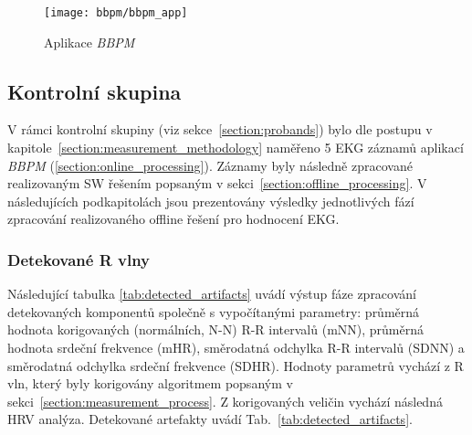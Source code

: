 \begin{figure}[H]
	\begin{center}
		\texttt{[image: bbpm/bbpm\_app]}
		\caption{Aplikace \textit{BBPM}}
		\label{fig:results_bbpm}
	\end{center}
\end{figure}

\clearpage

\subsection{Kontrolní skupina}
\label{sections:results_probands}
V rámci kontrolní skupiny (viz sekce~\ref{section:probands}) bylo dle postupu v
kapitole~\ref{section:measurement_methodology} naměřeno 5 EKG záznamů aplikací
\textit{BBPM} (\ref{section:online_processing}). Záznamy byly následně
zpracované realizovaným SW řešením popsaným v
sekci~\ref{section:offline_processing}. V následujících podkapitolách jsou
prezentovány výsledky jednotlivých fází zpracování realizovaného offline řešení
pro hodnocení EKG.

\subsubsection{Detekované R vlny}
Následující tabulka \ref{tab:detected_artifacts} uvádí výstup fáze zpracování
detekovaných komponentů společně s vypočítanými parametry: průměrná hodnota
korigovaných (normálních, N-N) R-R intervalů (mNN), průměrná hodnota srdeční
frekvence (mHR), směrodatná odchylka R-R intervalů (SDNN) a směrodatná odchylka
srdeční frekvence (SDHR). Hodnoty parametrů vychází z R vln, který byly
korigovány algoritmem popsaným v sekci~\ref{section:measurement_process}. Z
korigovaných veličin vychází následná HRV analýza. Detekované artefakty uvádí
Tab.~\ref{tab:detected_artifacts}.

